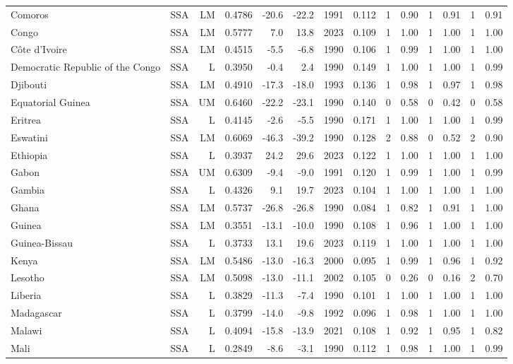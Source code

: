 \begin{longtable}{llrrrrrrrrrrrr}
Comoros & SSA & LM & 0.4786 & -20.6 & -22.2 & 1991 & 0.112 & 1 & 0.90 & 1 & 0.91 & 1 & 0.91 \\
Congo & SSA & LM & 0.5777 &   7.0 &  13.8 & 2023 & 0.109 & 1 & 1.00 & 1 & 1.00 & 1 & 1.00 \\
Côte d'Ivoire & SSA & LM & 0.4515 &  -5.5 &  -6.8 & 1990 & 0.106 & 1 & 0.99 & 1 & 1.00 & 1 & 1.00 \\
Democratic Republic of the Congo & SSA & L & 0.3950 &  -0.4 &   2.4 & 1990 & 0.149 & 1 & 1.00 & 1 & 1.00 & 1 & 0.99 \\
Djibouti & SSA & LM & 0.4910 & -17.3 & -18.0 & 1993 & 0.136 & 1 & 0.98 & 1 & 0.97 & 1 & 0.98 \\
Equatorial Guinea & SSA & UM & 0.6460 & -22.2 & -23.1 & 1990 & 0.140 & 0 & 0.58 & 0 & 0.42 & 0 & 0.58 \\
Eritrea & SSA & L & 0.4145 &  -2.6 &  -5.5 & 1990 & 0.171 & 1 & 1.00 & 1 & 1.00 & 1 & 0.99 \\
Eswatini & SSA & LM & 0.6069 & -46.3 & -39.2 & 1990 & 0.128 & 2 & 0.88 & 0 & 0.52 & 2 & 0.90 \\
Ethiopia & SSA & L & 0.3937 &  24.2 &  29.6 & 2023 & 0.122 & 1 & 1.00 & 1 & 1.00 & 1 & 1.00 \\
Gabon & SSA & UM & 0.6309 &  -9.4 &  -9.0 & 1991 & 0.120 & 1 & 0.99 & 1 & 1.00 & 1 & 0.99 \\
Gambia & SSA & L & 0.4326 &   9.1 &  19.7 & 2023 & 0.104 & 1 & 1.00 & 1 & 1.00 & 1 & 1.00 \\
Ghana & SSA & LM & 0.5737 & -26.8 & -26.8 & 1990 & 0.084 & 1 & 0.82 & 1 & 0.91 & 1 & 1.00 \\
Guinea & SSA & LM & 0.3551 & -13.1 & -10.0 & 1990 & 0.108 & 1 & 0.96 & 1 & 1.00 & 1 & 1.00 \\
Guinea-Bissau & SSA & L & 0.3733 &  13.1 &  19.6 & 2023 & 0.119 & 1 & 1.00 & 1 & 1.00 & 1 & 1.00 \\
Kenya & SSA & LM & 0.5486 & -13.0 & -16.3 & 2000 & 0.095 & 1 & 0.99 & 1 & 0.96 & 1 & 0.92 \\
Lesotho & SSA & LM & 0.5098 & -13.0 & -11.1 & 2002 & 0.105 & 0 & 0.26 & 0 & 0.16 & 2 & 0.70 \\
Liberia & SSA & L & 0.3829 & -11.3 &  -7.4 & 1990 & 0.101 & 1 & 1.00 & 1 & 1.00 & 1 & 1.00 \\
Madagascar & SSA & L & 0.3799 & -14.0 &  -9.8 & 1992 & 0.096 & 1 & 0.98 & 1 & 1.00 & 1 & 1.00 \\
Malawi & SSA & L & 0.4094 & -15.8 & -13.9 & 2021 & 0.108 & 1 & 0.92 & 1 & 0.95 & 1 & 0.82 \\
Mali & SSA & L & 0.2849 &  -8.6 &  -3.1 & 1990 & 0.112 & 1 & 0.98 & 1 & 1.00 & 1 & 0.99 \\

\end{longtable}
